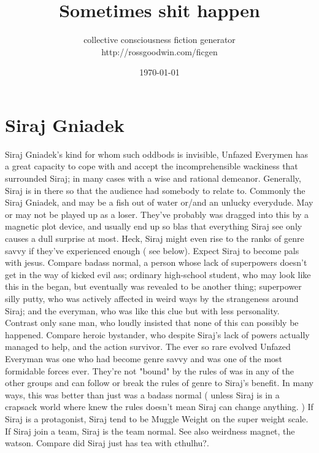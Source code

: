 \documentclass[12pt]{book}
\title{Sometimes shit happen}
\author{collective consciousness fiction generator\\http://rossgoodwin.com/ficgen}
\date{\today}
\begin{document}
\maketitle



\chapter{Siraj Gniadek}

Siraj Gniadek's kind for whom such oddbods is invisible, Unfazed Everymen has a great capacity to cope with and accept the incomprehensible wackiness that surrounded Siraj; in many cases with a wise and rational demeanor. Generally, Siraj is in there so that the audience had somebody to relate to. Commonly the Siraj Gniadek, and may be a fish out of water or/and an unlucky everydude. May or may not be played up as a loser. They've probably was dragged into this by a magnetic plot device, and usually end up so blas that everything Siraj see only causes a dull surprise at most. Heck, Siraj might even rise to the ranks of genre savvy if they've experienced enough ( see below). Expect Siraj to become pals with jesus. Compare badass normal, a person whose lack of superpowers doesn't get in the way of kicked evil ass; ordinary high-school student, who may look like this in the began, but eventually was revealed to be another thing; superpower silly putty, who was actively affected in weird ways by the strangeness around Siraj; and the everyman, who was like this clue but with less personality. Contrast only sane man, who loudly insisted that none of this can possibly be happened. Compare heroic bystander, who despite Siraj's lack of powers actually managed to help, and the action survivor. The ever so rare evolved Unfazed Everyman was one who had become genre savvy and was one of the most formidable forces ever. They're not "bound" by the rules of was in any of the other groups and can follow or break the rules of genre to Siraj's benefit. In many ways, this was better than just was a badass normal ( unless Siraj is in a crapsack world where knew the rules doesn't mean Siraj can change anything. ) If Siraj is a protagonist, Siraj tend to be Muggle Weight on the super weight scale. If Siraj join a team, Siraj is the team normal. See also weirdness magnet, the watson. Compare did Siraj just has tea with cthulhu?.
\end{document}
